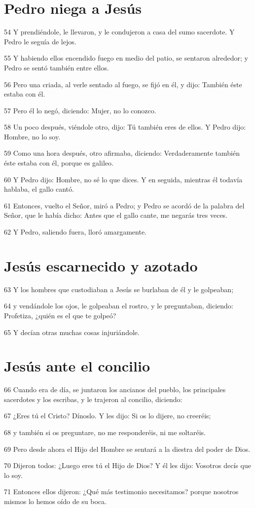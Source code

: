 \section*{Pedro niega a Jesús}

\par 54 Y prendiéndole, le llevaron, y le condujeron a casa del sumo sacerdote. Y Pedro le seguía de lejos.
\par 55 Y habiendo ellos encendido fuego en medio del patio, se sentaron alrededor; y Pedro se sentó también entre ellos.
\par 56 Pero una criada, al verle sentado al fuego, se fijó en él, y dijo: También éste estaba con él.
\par 57 Pero él lo negó, diciendo: Mujer, no lo conozco.
\par 58 Un poco después, viéndole otro, dijo: Tú también eres de ellos. Y Pedro dijo: Hombre, no lo soy.
\par 59 Como una hora después, otro afirmaba, diciendo: Verdaderamente también éste estaba con él, porque es galileo.
\par 60 Y Pedro dijo: Hombre, no sé lo que dices. Y en seguida, mientras él todavía hablaba, el gallo cantó.
\par 61 Entonces, vuelto el Señor, miró a Pedro; y Pedro se acordó de la palabra del Señor, que le había dicho: Antes que el gallo cante, me negarás tres veces.
\par 62 Y Pedro, saliendo fuera, lloró amargamente.

\section*{Jesús escarnecido y azotado}

\par 63 Y los hombres que custodiaban a Jesús se burlaban de él y le golpeaban;
\par 64 y vendándole los ojos, le golpeaban el rostro, y le preguntaban, diciendo: Profetiza, ¿quién es el que te golpeó?
\par 65 Y decían otras muchas cosas injuriándole.

\section*{Jesús ante el concilio}

\par 66 Cuando era de día, se juntaron los ancianos del pueblo, los principales sacerdotes y los escribas, y le trajeron al concilio, diciendo:
\par 67 ¿Eres tú el Cristo? Dínoslo. Y les dijo: Si os lo dijere, no creeréis;
\par 68 y también si os preguntare, no me responderéis, ni me soltaréis.
\par 69 Pero desde ahora el Hijo del Hombre se sentará a la diestra del poder de Dios.
\par 70 Dijeron todos: ¿Luego eres tú el Hijo de Dios? Y él les dijo: Vosotros decís que lo soy.
\par 71 Entonces ellos dijeron: ¿Qué más testimonio necesitamos? porque nosotros mismos lo hemos oído de su boca.

